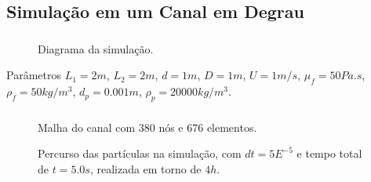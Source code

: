 \documentclass{beamer}
\begin{document}
\subsection*{Simulação em um Canal em Degrau}
\begin{frame}
  \frametitle{\subsecname}
  
  \begin{figure}
     {\raggedleft \tiny Diagrama da simulação.}
  \end{figure}
  \begin{block}{Parâmetros}
    $L_1=2m$, $L_2=2m$, $d=1m$, $D=1m$, $U=1m/s$, $\mu_f=50Pa.s$, $\rho_f=50kg/m^3$, $d_p=0.001m$, $\rho_p=20000kg/m^3$.
  \end{block}
\end{frame}

\begin{frame}
  \frametitle{\subsecname}
  
  \begin{figure}
     {\raggedleft \tiny Malha do canal com 380 nós e 676 elementos.}
  \end{figure}
  \vspace*{-\baselineskip}\setlength\belowdisplayshortskip{0pt} %
  \begin{figure}
     {\raggedleft \tiny Percurso das partículas na simulação, com $dt=5E^{-5}$ e tempo total de $t=5.0s$, realizada em torno de $4h$.}
  \end{figure}
\end{frame}
\end{document}
